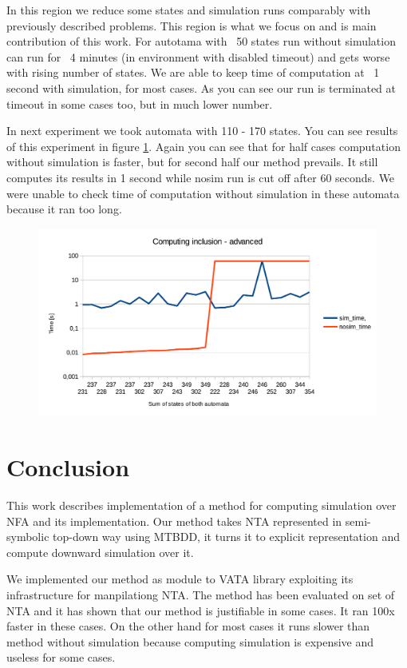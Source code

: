 \documentclass[a4paper, 12pt]{article}
\begin{document}
In this region we reduce some states and simulation runs comparably with previously described problems. This region is what we focus on and is main contribution of this work. For autotama with ~50 states run without simulation can run for ~4 minutes (in environment with disabled timeout) and gets worse with rising number of states. We are able to keep time of computation at ~1 second with simulation, for most cases. As you can see our run is terminated at timeout in some cases too, but in much lower number.

In next experiment we took automata with 110 - 170 states. You can see results of this experiment in figure \ref{fig:g_advanced}. Again you can see that for half cases computation without simulation is faster, but for second half our method  prevails. It still computes its results in 1 second while nosim run is cut off after 60 seconds. We were unable to check time of computation without simulation in these automata because it ran too long.

\begin{figure}[h]
	\centering
	\includegraphics{g_advanced}
	\caption{}
	\label{fig:g_advanced}
\end{figure}

\section{Conclusion}
\label{sec:end}

This work describes implementation of a method for computing simulation over NFA and its implementation.
Our method takes NTA represented in semi-symbolic top-down way using MTBDD, it
turns it to explicit representation and compute downward simulation over it.

We implemented our method as module to VATA library exploiting its infrastructure for manpilationg NTA.
The method has been evaluated on set of NTA and it has shown that our method is justifiable in some cases. It ran 100x faster in these cases. On the other hand for most cases it runs slower than method without simulation because computing simulation is expensive and useless for some cases.
\end{document}
